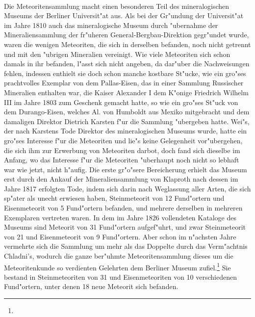 \documentclass[a4paper, 11pt, oneside]{article}
\begin{document}
\paragraph{}
Die Meteoritensammlung macht einen besonderen Teil des mineralogischen Museums der Berliner Universit"at aus. Als bei der Gr"undung der Universit"at im Jahre 1810 auch das mineralogische Museum durch "ubernahme der Mineraliensammlung der fr"uheren General-Bergbau-Direktion gegr"undet wurde, waren die wenigen Meteoriten, die sich in derselben befanden, noch nicht getrennt und mit den "ubrigen Mineralien vereinigt. Wie viele Meteoriten sich schon damals in ihr befanden, l"asst sich nicht angeben, da dar"uber die Nachweisungen fehlen, indessen enthielt sie doch schon manche kostbare St"ucke, wie ein gro"ses prachtvolles Exemplar von dem Pallas-Eisen, das in einer Sammlung Russischer Mineralien enthalten war, die Kaiser Alexander I dem K"onige Friedrich Wilhelm III im Jahre 1803 zum Geschenk gemacht hatte, so wie ein gro"ses St"uck von dem Durango-Eisen, welches Al. von Humboldt aus Mexiko mitgebracht und dem damaligen Direktor Dietrich Karsten f"ur die Sammlung "ubergeben hatte. Wei"s, der nach Karstens Tode Direktor des mineralogischen Museums wurde, hatte ein gro"ses Interesse f"ur die Meteoriten und lie"s keine Gelegenheit vor"ubergehen, die sich ihm zur Erwerbung von Meteoriten darbot, doch fand sich dieselbe im Anfang, wo das Interesse f"ur die Meteoriten "uberhaupt noch nicht so lebhaft war wie jetzt, nicht h"aufig. Die erste gr"o"sere Bereicherung erhielt das Museum erst durch den Ankauf der Mineraliensammlung von Klaproth nach dessen im Jahre 1817 erfolgten Tode, indem sich darin nach Weglassung aller Arten, die sich sp"ater als unecht erwiesen haben, Steinmeteorit von 12 Fund"ortern und Eisenmeteorit von 5 Fund"ortern befanden, und mehrere derselben in mehreren Exemplaren vertreten waren. In dem im Jahre 1826 vollendeten Kataloge des Museums sind Meteorit von 31 Fund"ortern aufgef"uhrt, und zwar Steinmeteorit von 21 und Eisenmeteorit von 9 Fund"ortern. Aber schon im n"achsten Jahre vermehrte sich die Sammlung um mehr als das Doppelte durch das Verm"achtnis Chladni's, wodurch die ganze ber"uhmte Meteoritensammlung dieses um die Meteoritenkunde so verdienten Gelehrten dem Berliner Museum zufiel.\footnote{} Sie bestand in Steinmeteoriten von 31 und Eisenmeteoriten von 10 verschiedenen Fund"ortern, unter denen 18 neue Meteorit sich befanden.
\end{document}
